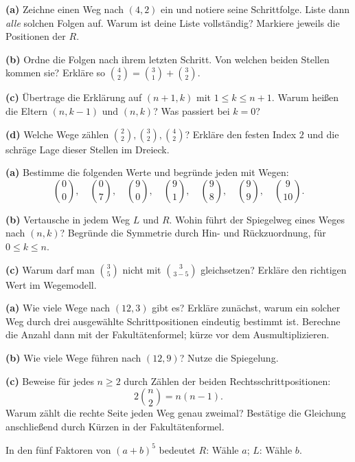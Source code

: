 \begin{center}\PascalAufgabeStart\end{center}
\textbf{(a)} Zeichne einen Weg nach $(4,2)$ ein und notiere seine
Schrittfolge. Liste dann \emph{alle} solchen Folgen auf. Warum ist
deine Liste vollständig? Markiere jeweils die Positionen der $R$.

\textbf{(b)} Ordne die Folgen nach ihrem letzten Schritt. Von welchen
beiden Stellen kommen sie? Erkläre so $\binom42=\binom31+\binom32$.

\textbf{(c)} Übertrage die Erklärung auf $(n+1,k)$ mit $1\le k\le n+1$.
Warum heißen die Eltern $(n,k-1)$ und $(n,k)$? Was passiert bei $k=0$?

\textbf{(d)} Welche Wege zählen $\binom22,\binom32,\binom42$?
Erkläre den festen Index $2$ und die schräge Lage dieser Stellen im Dreieck.

\textbf{(a)} Bestimme die folgenden Werte und begründe jeden mit Wegen:
\[
 \binom00,\quad\binom07,\quad\binom90,\quad\binom91,
 \quad\binom98,\quad\binom99,\quad\binom9{10}.
\]

\textbf{(b)} Vertausche in jedem Weg $L$ und $R$. Wohin führt der
Spiegelweg eines Weges nach $(n,k)$? Begründe die Symmetrie durch
Hin- und Rückzuordnung, für $0\le k\le n$.

\textbf{(c)} Warum darf man $\binom35$ nicht mit
$\binom3{3-5}$ gleichsetzen? Erkläre den richtigen Wert im Wegemodell.

\textbf{(a)} Wie viele Wege nach $(12,3)$ gibt es? Erkläre zunächst,
warum ein solcher Weg durch drei ausgewählte Schrittpositionen
eindeutig bestimmt ist. Berechne die Anzahl dann mit der Fakultätenformel;
kürze vor dem Ausmultiplizieren.

\textbf{(b)} Wie viele Wege führen nach $(12,9)$? Nutze die Spiegelung.

\textbf{(c)} Beweise für jedes $n\ge2$ durch Zählen der beiden
Rechtsschrittpositionen:
\[
 2\binom n2=n(n-1).
\]
Warum zählt die rechte Seite jeden Weg genau zweimal?
Bestätige die Gleichung anschließend durch Kürzen in der Fakultätenformel.

In den fünf Faktoren von $(a+b)^5$ bedeutet $R$: Wähle $a$;
$L$: Wähle $b$.

